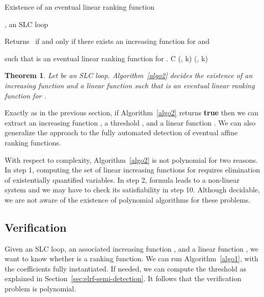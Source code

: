\documentclass{acm_proc_article-sp}
\newtheorem{theorem}{Theorem}[section]
\newcommand{\dec}{\mathrm{DEC}}
\newcommand{\pos}{\mathrm{POS}}
\begin{document}
\begin{algorithm}
\caption{Existence of an eventual linear ranking function}
\label{algo2}
\begin{algorithmic}[1]
\REQUIRE
, an SLC loop

\ENSURE
Returns \TRUE\ if and only if there exists an increasing function 
for  and

such that  is an eventual linear ranking function for .
\STATE
C
\STATE
\rho
\STATE
\dec(, k)
\STATE
\rho
\STATE
\pos(, k)
\STATE

\STATE
 
 \STATE
 
 \STATE

\RETURN \TRUE
\ELSE  \RETURN \FALSE
\ENDIF
\end{algorithmic}
\end{algorithm}

\begin{theorem}
\label{algo2-is-a-decision-procedure-for-elrf}
Let  be an SLC loop.
\textup{Algorithm~\ref{algo2}} decides the existence of an increasing
function  and a linear function  such that  is an
eventual linear ranking function for .
\end{theorem}

Exactly as in the previous section, if Algorithm~\ref{algo2}
returns \textbf{true} then we can extract an increasing function ,
a threshold , and a linear function .
We can also generalize the approach to the fully automated
detection of eventual affine ranking functions.

With respect to complexity,
Algorithm~\ref{algo2}  is not polynomial for two reasons.
In step 1, computing the set  of linear increasing functions for 
requires elimination of existentially quantified variables.
In step 2, formula   leads to a non-linear system
and we may have to check its satisfiability in step 10.
Although decidable, we are not aware of the existence of
polynomial algorithms for these problems.

\subsection{Verification}
\label{sec:verification}

Given  an SLC loop, an associated increasing
function , and a linear function , we want to know whether
 is a ranking function.
We can run Algorithm~\ref{algo1}, with the coefficients 
fully instantiated. If needed, we can compute the threshold 
as explained in Section~\ref{sec:elrf-semi-detection}.
It follows that the verification problem is polynomial.
\end{document}
